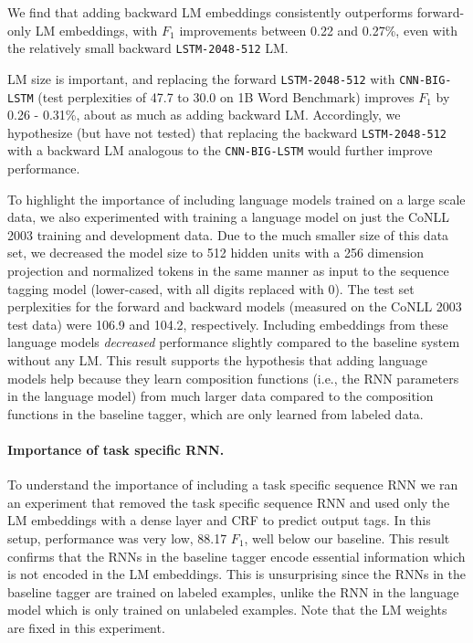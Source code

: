 \documentclass[11pt,a4paper]{article}
\begin{document}
We find that adding backward LM embeddings consistently outperforms forward-only LM embeddings, with $F_1$ improvements between 0.22 and 0.27\%, even with the relatively small backward \texttt{LSTM-2048-512} LM.

LM size is important, and replacing the forward \texttt{LSTM-2048-512} with \texttt{CNN-BIG-LSTM} (test perplexities of 47.7 to 30.0 on 1B Word Benchmark) improves $F_1$ by 0.26 - 0.31\%, about as much as adding backward LM. Accordingly, we hypothesize (but have not
tested) that replacing the backward \texttt{LSTM-2048-512} with a backward LM analogous to the
\texttt{CNN-BIG-LSTM} would further improve performance.

To highlight the importance of including language models trained on a large scale data, we also experimented
with training a language model on just the CoNLL 2003 training and development data.  Due to the much smaller size
of this data set, we decreased the model size to 512 hidden units with a 256 dimension projection and
normalized tokens in the same manner as input to the sequence tagging model (lower-cased, with all digits replaced
with 0).  The test set perplexities for the forward and backward models (measured on the CoNLL 2003 test data) were 106.9 and 104.2, respectively.  Including embeddings from these language models
\textit{decreased} performance slightly compared to the baseline system without any LM.
This result supports the hypothesis that adding language models help because they learn composition functions (i.e., the RNN parameters in the language model) from much larger data compared to the composition functions in the baseline tagger, which are only learned from labeled data.

\paragraph{Importance of task specific RNN.}
To understand the importance of including a task specific sequence RNN
we ran an experiment that removed the task specific sequence RNN and used only the LM embeddings with a dense layer and CRF to predict output tags.  In this setup, performance was very low, 88.17 $F_1$, well below our baseline.
This result confirms that the RNNs in the baseline tagger encode essential information which is not encoded in the LM embeddings.
This is unsurprising since the RNNs in the baseline tagger are trained on labeled examples, unlike the RNN in the language model which is only trained on unlabeled examples.
Note that the LM weights are fixed in this experiment.
\end{document}
